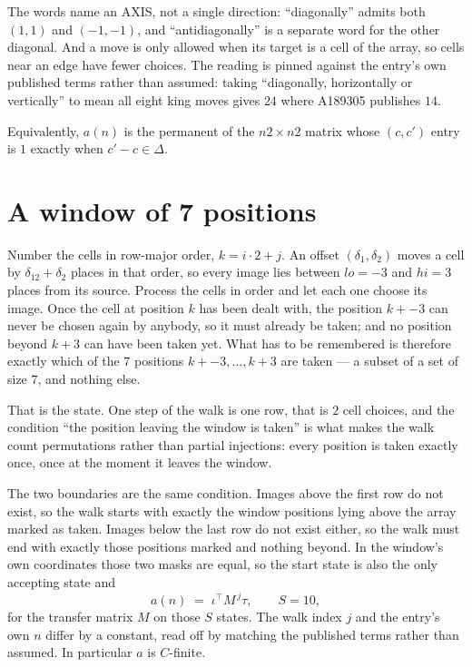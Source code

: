 \documentclass[11pt,a4paper]{article}
\theoremstyle{plain}
\theoremstyle{definition}
\begin{document}
The words name an AXIS, not a single direction: ``diagonally'' admits
both $(1,1)$ and $(-1,-1)$, and ``antidiagonally'' is a separate word for the other diagonal.
And a move is only allowed when its target is a cell of the array, so cells near an
edge have fewer choices. The reading is pinned against the entry's own published terms rather
than assumed: taking ``diagonally, horizontally or vertically'' to mean all eight king moves
gives $24$ where A189305 publishes $14$.

Equivalently, $a(n)$ is the permanent of the $n2\times n2$ matrix whose $(c,c')$ entry is
$1$ exactly when $c'-c\in\Delta$.

\section{A window of 7 positions}

Number the cells in row-major order, $k=i\cdot2+j$. An offset $(\delta_1,\delta_2)$ moves a
cell by $\delta_12+\delta_2$ places in that order, so every image lies between $lo=-3$ and
$hi=3$ places from its source. Process the cells in order and let each one choose its image.
Once the cell at position $k$ has been dealt with, the position $k+-3$ can never be chosen
again by anybody, so it must already be taken; and no position beyond $k+3$ can have been
taken yet. What has to be remembered is therefore exactly which of the $7$ positions
$k+-3,\dots,k+3$ are taken --- a subset of a set of size $7$, and nothing else.

That is the state. One step of the walk is one row, that is $2$ cell choices, and the
condition ``the position leaving the window is taken'' is what makes the walk count permutations
rather than partial injections: every position is taken exactly once, once at the moment it
leaves the window.

The two boundaries are the same condition. Images above the first row do not exist, so the walk
starts with exactly the window positions lying above the array marked as taken. Images below the
last row do not exist either, so the walk must end with exactly those positions marked and
nothing beyond. In the window's own coordinates those two masks are equal, so the start state is
also the only accepting state and
\[
a(n)\;=\;\iota^{\!\top}M^{\,j}\tau ,\qquad S=10,
\]
for the transfer matrix $M$ on those $S$ states. The walk index $j$ and the entry's own $n$
differ by a constant, read off by matching the published terms rather than assumed. In
particular $a$ is $C$-finite.
\end{document}

